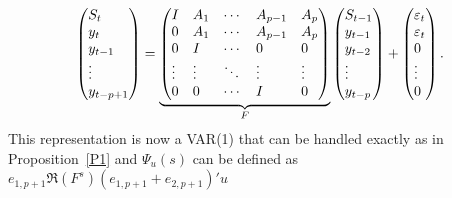\documentclass[12pt,fleqn]{article}
\begin{document}
\begin{equation*}
  \begin{pmatrix*}[l]
    S_t \\ y_t \\ y_{t-1} \\ \vdots \\ y_{t-p+1}
  \end{pmatrix*}
  =
  \underbrace{\begin{pmatrix*}[l]
    I      & A_1    & \cdots & A_{p-1} & A_p    \\
    0      & A_1    & \cdots & A_{p-1} & A_p    \\
    0      & I      & \cdots & 0       & 0      \\
    \vdots & \vdots & \ddots & \vdots  & \vdots \\
    0      & 0      & \cdots & I       & 0
  \end{pmatrix*}}_F
  \begin{pmatrix*}[l]
    S_{t-1}  \\ y_{t-1} \\ y_{t-2} \\ \vdots \\ y_{t-p}
  \end{pmatrix*}
  +
  \begin{pmatrix*}[l]
    \vep_t \\ \vep_t \\ 0 \\ \vdots \\ 0
  \end{pmatrix*}.
\end{equation*}
This representation is now a VAR(1) that can be handled exactly as in
Proposition~\ref{P1} and $\Psi_u(s)$ can be defined as
$e_{1,p+1} \Re(F^s) (e_{1,p+1} + e_{2,p+1})' u$
\end{document}
